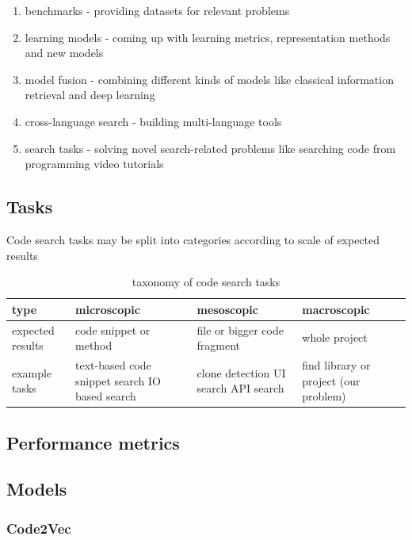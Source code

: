 \documentclass[11pt]{report}
\begin{document}
\begin{enumerate}
\label{codesearch}
    \item benchmarks - providing datasets for relevant problems
    \item learning models - coming up with learning metrics, representation methods and new models
    \item model fusion - combining different kinds of models like classical information retrieval and deep learning 
    \item cross-language search - building multi-language tools
    \item search tasks - solving novel search-related problems like searching code from programming video tutorials
\end{enumerate}


\subsection{Tasks}

Code search tasks may be split into categories according to scale of expected results

\begin{table}
  \caption{taxonomy of code search tasks}
  \centering
\begin{tabular}{|p{2cm}|p{4cm}|p{3cm}|p{4cm}|}
\hline
type & microscopic  & mesoscopic & macroscopic\\
\hline
expected results & code snippet or method & file or bigger code fragment & whole project\\
\hline
example tasks & text-based code snippet search \newline IO based search & clone detection \newline  UI search \newline API search  & find library or project (our problem) \\
\hline
\end{tabular}
\end{table}

\subsection{Performance metrics}

\subsection{Models}

\subsubsection{Code2Vec}
\end{document}
